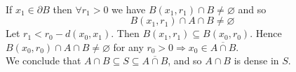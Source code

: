 \documentclass[A4paper,12pt]{article}
\theoremstyle{definition}
\numberwithin{equation}{section}
\begin{document}
\begin{enumerate}[(1)]
\begin{enumerate}[(a)]
                    \\If $x_1 \in \partial B$ then $\forall r_1 > 0$ we have  $B(x_1, r_1)\cap B \neq \varnothing$ and so
                    $$
                    B(x_1, r_1) \cap A \cap B  \neq \varnothing
                    $$
                    Let $r_1 < r_0 - d(x_0, x_1)$. Then $B(x_1, r_1) \subseteq B(x_0, r_0)$. 
                    Hence $B(x_0, r_0) \cap A \cap B \neq \varnothing$ for any $r_0 > 0 \Rightarrow x_0 \in \overline{A\cap B}$.
                    \\                    We conclude that $A \cap B \subseteq S \subseteq \overline{A\cap B}$, and so $A\cap B$ is dense in $S$.


            \end{enumerate}
\end{enumerate}
\end{document}
